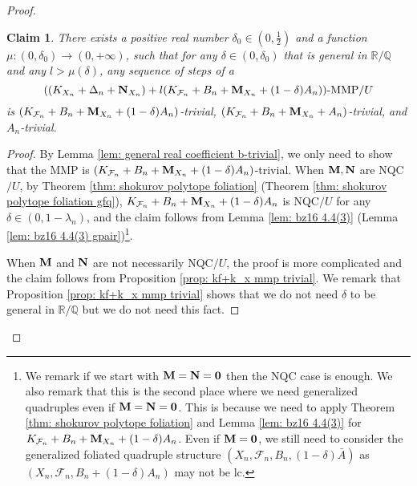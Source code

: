 \documentclass[11pt]{amsart}
\numberwithin{equation}{section}
\newcommand{\Mm}{{\bf{M}}}
\newcommand{\Nn}{{\bf{N}}}
\newcommand{\Ff}{\mathcal{F}}
\newtheorem{claim}[thm]{Claim}
\theoremstyle{definition}
\theoremstyle{definition}
\theoremstyle{definition}
\begin{document}
\begin{proof}
\begin{claim}\label{claim: second mmp trivialness}
    There exists a positive real number $\delta_0\in (0,\frac{1}{2})$ and a function $\mu: (0,\delta_0)\rightarrow (0,+\infty)$, such that for any $\delta\in (0,\delta_0)$ that is general in $\mathbb R/\mathbb Q$ and any $l>\mu(\delta)$, any sequence of steps of a 
$$((K_{X_n}+\Delta_n+\Nn_{X_n})+l(K_{\Ff_n}+B_n+\Mm_{X_n}+(1-\delta)A_n))\text{-MMP}/U$$
is $(K_{\Ff_n}+B_n+\Mm_{X_n}+(1-\delta)A_n)$-trivial,  $(K_{\Ff_n}+B_n+\Mm_{X_n}+A_n)$-trivial, and $A_n$-trivial.  
\end{claim}
\begin{proof}
By Lemma \ref{lem: general real coefficient b-trivial}, we only need to show that the MMP is  $(K_{\Ff_n}+B_n+\Mm_{X_n}+(1-\delta)A_n)$-trivial. When $\Mm,\Nn$ are NQC$/U$, by Theorem \ref{thm: shokurov polytope foliation} (Theorem \ref{thm: shokurov polytope foliation gfq}), $K_{\Ff_n}+B_n+\Mm_{X_n}+(1-\delta)A_n$ is NQC$/U$ for any $\delta\in (0,1-\lambda_n)$, and the claim follows from Lemma \ref{lem: bz16 4.4(3)} (Lemma \ref{lem: bz16 4.4(3) gpair})\footnote{We remark if we start with $\Mm=\Nn=\bm{0}$ then the NQC case is enough. We also remark that this is the second place where we need generalized quadruples even if $\Mm=\Nn=\bm{0}$. This is because we need to apply Theorem \ref{thm: shokurov polytope foliation} and Lemma \ref{lem: bz16 4.4(3)} for $K_{\Ff_n}+B_n+\Mm_{X_n}+(1-\delta)A_n$. Even if $\Mm=\bm{0}$, we still need to consider the generalized foliated quadruple structure $(X_n,\Ff_n,B_n,(1-\delta)\bar A)$ as $(X_n,\Ff_n,B_n+(1-\delta)A_n)$ may not be lc.}.



When $\Mm$ and $\Nn$ are not necessarily NQC$/U$, the proof is more complicated and the claim follows from  Proposition \ref{prop: kf+k_x mmp trivial}. We remark that Proposition \ref{prop: kf+k_x mmp trivial} shows that we do not need $\delta$ to be general in $\mathbb R/\mathbb Q$ but we do not need this fact.
\end{proof}


\end{proof}
\end{document}
